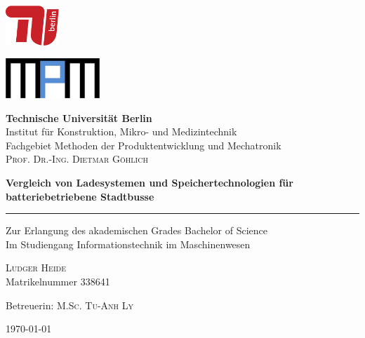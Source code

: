 \documentclass{scrreprt}
\begin{document}
\begin{titlepage}

\begin{minipage}{0.4\textwidth}
	\begin{flushleft}
		\includegraphics[height=1.5cm]{TU_Logo}
	\end{flushleft}
\end{minipage}
\hfill
\begin{minipage}{0.4\textwidth}
	\begin{flushright}
		\includegraphics[height=1.5cm]{MPM_Logo}%
	\end{flushright}
\end{minipage}

\begin{center}    
\textbf{\LARGE Technische Universität Berlin}\\
\large{Institut für Konstruktion, Mikro- und Medizintechnik}\\
\large{Fachgebiet Methoden der Produktentwicklung und Mechatronik}\\
\large{\textsc{Prof. Dr.-Ing. Dietmar Göhlich}}\\
\vfill

\huge{\textbf{Vergleich von Ladesystemen und Speichertechnologien für batteriebetriebene Stadtbusse}}\\
\rule{\linewidth}{1pt}
\large{Zur Erlangung des akademischen Grades Bachelor of Science}\\
\large{Im Studiengang Informationstechnik im Maschinenwesen}\\
\vfill

\large{\textsc{Ludger Heide}}\\
\large{Matrikelnummer 338641}\\
\vfill

\large{Betreuerin: \textsc{M.Sc. Tu-Anh Ly}}\\
\vfill

\large{\today}
\end{center}
\end{titlepage}
\end{document}

